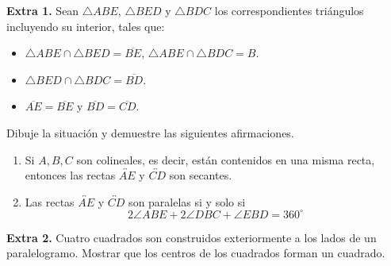 \documentclass{article}
\begin{document}
\vspace{5mm}
\noindent\textbf{Extra 1.} Sean $\triangle ABE$, $\triangle BED$ y $\triangle BDC$ los 
correspondientes triángulos incluyendo su interior, tales que:
\begin{itemize}
\item $\triangle ABE\cap\triangle BED=\overline{BE}$, $\triangle ABE\cap\triangle BDC=B$.
\item $\triangle BED\cap\triangle BDC=\overline{BD}$.
\item $\overline{AE}=\overline{BE}$ y $\overline{BD}=\overline{CD}$.
\end{itemize}
Dibuje la situación y demuestre las siguientes afirmaciones.
\begin{enumerate}
    \item Si $A,B,C$ son colineales, es decir, están contenidos en una misma recta, entonces las
    rectas $\overleftrightarrow{AE}$ y $\overleftrightarrow{CD}$ son secantes.
    \item Las rectas $\overleftrightarrow{AE}$ y $\overleftrightarrow{CD}$ son paralelas si y solo
    si
    \begin{equation*}
        2\angle ABE+2\angle DBC+\angle EBD=360^{\circ}
    \end{equation*}
\end{enumerate}

\vspace{5mm}
\noindent\textbf{Extra 2.} Cuatro cuadrados son construidos exteriormente a los lados de un 
paralelogramo. Mostrar que los centros de los cuadrados forman un cuadrado.

\end{document}
